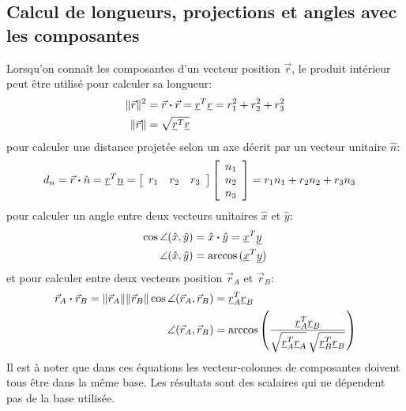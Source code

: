\subsection{Calcul de longueurs, projections et angles avec les composantes}
Lorsqu'on connaît les composantes d'un vecteur position $\vec{r}$, le produit intérieur peut être utilisé pour calculer sa longueur:
\begin{align}
\|\vec{r}\|^2 &= \vec{r} \boldsymbol{\cdot} \vec{r} = \underline{r}^T \underline{r} = r_1^2 + r_2^2 + r_3^2  \\
\|\vec{r}\|  &= \sqrt{ \underline{r}^T \underline{r} }
\end{align} 
pour calculer une distance projetée selon un axe décrit par un vecteur unitaire $\hat{n}$:
\begin{align}
d_n &= \vec{r} \boldsymbol{\cdot} \hat{n} = \underline{r}^T \underline{n} = 
\left[ \begin{array}{c c c} r_1 &  r_2 &  r_3  \end{array} \right]
\left[ \begin{array}{c}     n_1 \\ n_2 \\ n_3  \end{array} \right]
= r_1 n_1 + r_2 n_2 + r_3 n_3
\end{align} 
pour calculer un angle entre deux vecteurs unitaires $\hat{x}$ et $\hat{y}$:
\begin{align}
\cos \angle (\hat{x},\hat{y}) &= \hat{x} \boldsymbol{\cdot} \hat{y} = \underline{x}^T \underline{y} \\
\angle (\hat{x},\hat{y}) &= \arccos{ ( \underline{x}^T \underline{y} ) } 
\end{align} 
et pour calculer entre deux vecteurs position $\vec{r}_A$ et $\vec{r}_B$:
\begin{align}
\vec{r}_A \boldsymbol{\cdot} \vec{r}_B = \|\vec{r}_A\|  \|\vec{r}_B\|  \cos \angle (\vec{r}_A,\vec{r}_B) &= \underline{r}_A^T \underline{r}_B \\
\angle (\vec{r}_A,\vec{r}_B) &= \arccos{ \left( \frac{\underline{r}_A^T \underline{r}_B }{ \sqrt{ \underline{r}_A^T \underline{r}_A} \, \sqrt{ \underline{r}_B^T \underline{r}_B}} \right) }
\end{align} 
%
Il est à noter que dans ces équations les vecteur-colonnes de composantes doivent tous être dans la même base. Les résultats sont des scalaires qui ne dépendent pas de la base utilisée. 

